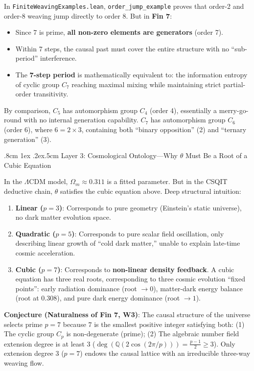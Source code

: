 \documentclass[aps,prd,twocolumn,nofootinbib,floatfix]{revtex4-2}
\makeatletter
\def\subsubsection{%
  \@startsection{subsubsection}{3}{\z@}
    {.8cm \@plus1ex \@minus .2ex}{.5cm}
    {\normalfont\normalsize\itshape\centering}%
}
\makeatother
\begin{document}
In \texttt{FiniteWeavingExamples.lean}, \texttt{order\_jump\_example} proves that order-2 and order-8 weaving jump directly to order 8. But in \textbf{Fin 7}:
\begin{itemize}
    \item Since 7 is prime, \textbf{all non-zero elements are generators} (order 7).
    \item Within 7 steps, the causal past must cover the entire structure with no ``sub-period'' interference.
    \item The \textbf{7-step period} is mathematically equivalent to: the information entropy of cyclic group $C_7$ reaching maximal mixing while maintaining strict partial-order transitivity.
\end{itemize}

By comparison, $C_5$ has automorphism group $C_4$ (order 4), essentially a merry-go-round with no internal generation capability. $C_7$ has automorphism group $C_6$ (order 6), where $6 = 2 \times 3$, containing both ``binary opposition'' (2) and ``ternary generation'' (3).

\subsubsection{Layer 3: Cosmological Ontology---Why $\theta$ Must Be a Root of a Cubic Equation}

In the $\Lambda$CDM model, $\Omega_m \approx 0.311$ is a fitted parameter. But in the CSQIT deductive chain, $\theta$ satisfies the cubic equation above. Deep structural intuition:
\begin{enumerate}
    \item \textbf{Linear ($p=3$)}: Corresponds to pure geometry (Einstein's static universe), no dark matter evolution space.
    \item \textbf{Quadratic ($p=5$)}: Corresponds to pure scalar field oscillation, only describing linear growth of ``cold dark matter,'' unable to explain late-time cosmic acceleration.
    \item \textbf{Cubic ($p=7$)}: Corresponds to \textbf{non-linear density feedback}. A cubic equation has three real roots, corresponding to three cosmic evolution ``fixed points'': early radiation dominance (root $\to 0$), matter-dark energy balance (root at 0.308), and pure dark energy dominance (root $\to 1$).
\end{enumerate}

\textbf{Conjecture (Naturalness of Fin 7, W3)}: The causal structure of the universe selects prime $p=7$ because $7$ is the smallest positive integer satisfying both: (1) The cyclic group $C_p$ is non-degenerate (prime); (2) The algebraic number field extension degree is at least 3 ($\deg(\mathbb{Q}(2\cos(2\pi/p))) = \frac{p-1}{2} \ge 3$). Only extension degree 3 ($p=7$) endows the causal lattice with an irreducible three-way weaving flow.
\end{document}
